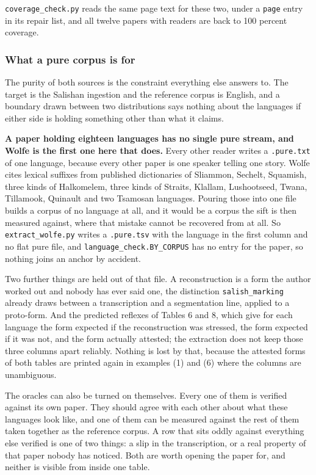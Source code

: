 \texttt{coverage\_\allowbreak{}check.\allowbreak{}py} reads the same page text for these two, under a \texttt{page} entry in its repair list, and all twelve papers with readers are back to 100 percent coverage.

\subsubsection{What a pure corpus is for}

The purity of both sources is the constraint everything else answers to. The target is the Salishan ingestion and the reference corpus is English, and a boundary drawn between two distributions says nothing about the languages if either side is holding something other than what it claims.

\textbf{A paper holding eighteen languages has no single pure stream, and Wolfe is the first one here that does.} Every other reader writes a \texttt{.\allowbreak{}pure.\allowbreak{}txt} of one language, because every other paper is one speaker telling one story. Wolfe cites lexical suffixes from published dictionaries of Sliammon, Sechelt, Squamish, three kinds of Halkomelem, three kinds of Straits, Klallam, Lushootseed, Twana, Tillamook, Quinault and two Tsamosan languages. Pouring those into one file builds a corpus of no language at all, and it would be a corpus the sift is then measured against, where that mistake cannot be recovered from at all. So \texttt{extract\_\allowbreak{}wolfe.\allowbreak{}py} writes a \texttt{.\allowbreak{}pure.\allowbreak{}tsv} with the language in the first column and no flat pure file, and \texttt{language\_\allowbreak{}check.\allowbreak{}BY\_\allowbreak{}CORPUS} has no entry for the paper, so nothing joins an anchor by accident.

Two further things are held out of that file. A reconstruction is a form the author worked out and nobody has ever said one, the distinction \texttt{salish\_\allowbreak{}marking} already draws between a transcription and a segmentation line, applied to a proto-form. And the predicted reflexes of Tables 6 and 8, which give for each language the form expected if the reconstruction was stressed, the form expected if it was not, and the form actually attested; the extraction does not keep those three columns apart reliably. Nothing is lost by that, because the attested forms of both tables are printed again in examples (1) and (6) where the columns are unambiguous.

The oracles can also be turned on themselves. Every one of them is verified against its own paper. They should agree with each other about what these languages look like, and one of them can be measured against the rest of them taken together as the reference corpus. A row that sits oddly against everything else verified is one of two things: a slip in the transcription, or a real property of that paper nobody has noticed. Both are worth opening the paper for, and neither is visible from inside one table.

